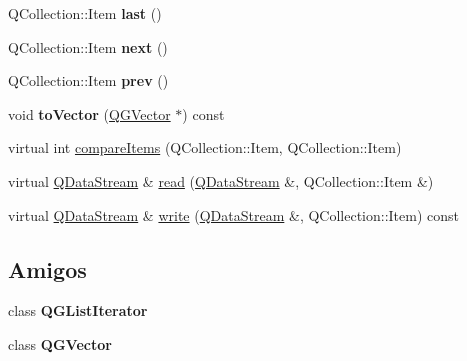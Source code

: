 \begin{DoxyCompactItemize}
\item 
\hypertarget{class_q_g_list_a9618a48e64338b9bd2426bb6378772cd}{Q\-Collection\-::\-Item {\bfseries last} ()}\label{class_q_g_list_a9618a48e64338b9bd2426bb6378772cd}

\item 
\hypertarget{class_q_g_list_ad3314e6704fc58a52d4b90f34f6ed20e}{Q\-Collection\-::\-Item {\bfseries next} ()}\label{class_q_g_list_ad3314e6704fc58a52d4b90f34f6ed20e}

\item 
\hypertarget{class_q_g_list_ac7c47bea4f54fb22f61cf1a9981f2de6}{Q\-Collection\-::\-Item {\bfseries prev} ()}\label{class_q_g_list_ac7c47bea4f54fb22f61cf1a9981f2de6}

\item 
\hypertarget{class_q_g_list_a49819680b3cd102b91cfce427dec7689}{void {\bfseries to\-Vector} (\hyperlink{class_q_g_vector}{Q\-G\-Vector} $\ast$) const }\label{class_q_g_list_a49819680b3cd102b91cfce427dec7689}

\item 
virtual int \hyperlink{class_q_g_list_aac689c6d7a54b6558afbd53845183af8}{compare\-Items} (Q\-Collection\-::\-Item, Q\-Collection\-::\-Item)
\item 
virtual \hyperlink{class_q_data_stream}{Q\-Data\-Stream} \& \hyperlink{class_q_g_list_a0c0d849cb524232b008db07c0c8d5b7b}{read} (\hyperlink{class_q_data_stream}{Q\-Data\-Stream} \&, Q\-Collection\-::\-Item \&)
\item 
virtual \hyperlink{class_q_data_stream}{Q\-Data\-Stream} \& \hyperlink{class_q_g_list_a4a129683a3487b947f59307cb61d2b82}{write} (\hyperlink{class_q_data_stream}{Q\-Data\-Stream} \&, Q\-Collection\-::\-Item) const 
\end{DoxyCompactItemize}
\subsection*{Amigos}
\begin{DoxyCompactItemize}
\item 
\hypertarget{class_q_g_list_a13dc100371e8931a394e57af8df9fbb3}{class {\bfseries Q\-G\-List\-Iterator}}\label{class_q_g_list_a13dc100371e8931a394e57af8df9fbb3}

\item 
\hypertarget{class_q_g_list_add83e2909bfdb7817ab2363440f946de}{class {\bfseries Q\-G\-Vector}}\label{class_q_g_list_add83e2909bfdb7817ab2363440f946de}

\end{DoxyCompactItemize}
